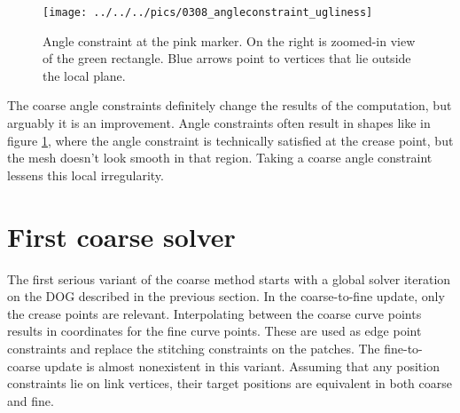 \documentclass[a4paper,twoside,12pt,nochapterprefix]{scrbook}
\begin{document}
\begin{figure}
    \centering
    \texttt{[image: ../../../pics/0308\_angleconstraint\_ugliness]}
    \caption{Angle constraint at the pink marker. On the right is zoomed-in view of the green rectangle. Blue arrows point to vertices that lie outside the local plane.}
      \label{fig:angleconstraint_ugliness}
\end{figure}
The coarse angle constraints definitely change the results of the computation, but arguably it is an improvement. Angle constraints often result in shapes like in figure \ref{fig:angleconstraint_ugliness}, where the angle constraint is technically satisfied at the crease point, but the mesh doesn't look smooth in that region. Taking a coarse angle constraint lessens this local irregularity.\newline
\section{First coarse solver}\label{sec:first_coarse} 
The first serious variant of the coarse method starts with a global solver iteration on the DOG described in the previous section.\newline%
In the coarse-to-fine update, only the crease points are relevant. Interpolating between the coarse curve points results in coordinates for the fine curve points. These are used as edge point constraints and replace the stitching constraints on the patches.\newline
The fine-to-coarse update is almost nonexistent in this variant. Assuming that any position constraints lie on link vertices, their target positions are equivalent in both coarse and fine.\newline
\end{document}
